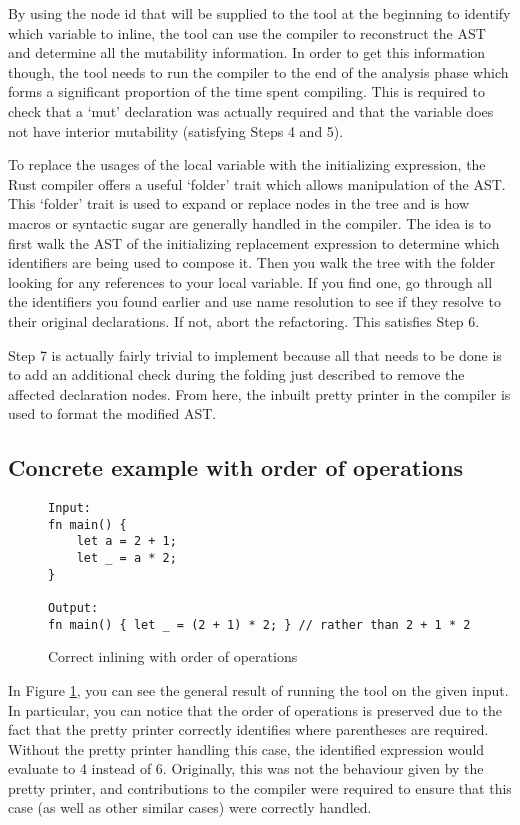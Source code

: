 By using the node id that will be supplied to the tool at the beginning to identify which variable to inline, the tool can use the compiler to reconstruct the AST and determine all the mutability information. In order to get this information though, the tool needs to run the compiler to the end of the analysis phase which forms a significant proportion of the time spent compiling. This is required to check that a `mut' declaration was actually required and that the variable does not have interior mutability (satisfying Steps 4 and 5).

To replace the usages of the local variable with the initializing expression, the Rust compiler offers a useful `folder' trait which allows manipulation of the AST. This `folder' trait is used to expand or replace nodes in the tree and is how macros or syntactic sugar are generally handled in the compiler. The idea is to first walk the AST of the initializing replacement expression to determine which identifiers are being used to compose it. Then you walk the tree with the folder looking for any references to your local variable. If you find one, go through all the identifiers you found earlier and use name resolution to see if they resolve to their original declarations. If not, abort the refactoring. This satisfies Step 6.

Step 7 is actually fairly trivial to implement because all that needs to be done is to add an additional check during the folding just described to remove the affected declaration nodes. From here, the inbuilt pretty printer in the compiler is used to format the modified AST.

\subsection{Concrete example with order of operations}

\begin{figure}[H]
\centering
\begin{verbatim}
Input:
fn main() {
    let a = 2 + 1;
    let _ = a * 2;
}

Output:
fn main() { let _ = (2 + 1) * 2; } // rather than 2 + 1 * 2
\end{verbatim}
\caption{Correct inlining with order of operations}
\label{Fig:exinline}
\end{figure}

In Figure \ref{Fig:exinline}, you can see the general result of running the tool on the given input. In particular, you can notice that the order of operations is preserved due to the fact that the pretty printer correctly identifies where parentheses are required. Without the pretty printer handling this case, the identified expression would evaluate to 4 instead of 6. Originally, this was not the behaviour given by the pretty printer, and contributions to the compiler were required to ensure that this case (as well as other similar cases) were correctly handled.

